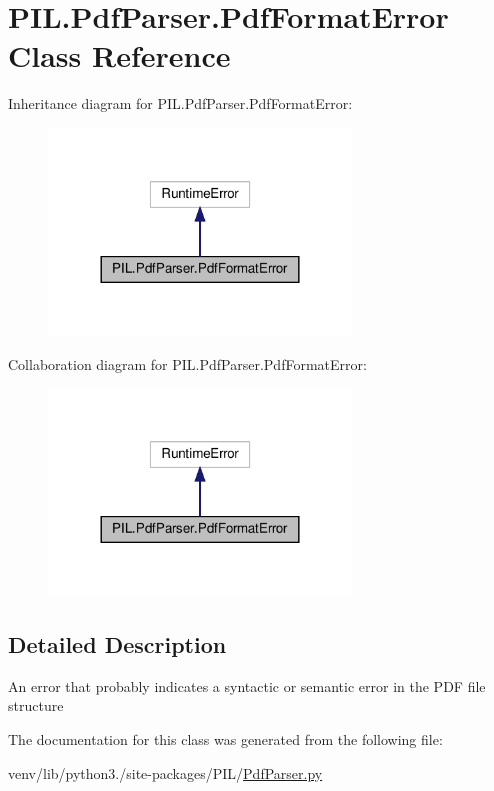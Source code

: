 \hypertarget{classPIL_1_1PdfParser_1_1PdfFormatError}{}\section{P\+I\+L.\+Pdf\+Parser.\+Pdf\+Format\+Error Class Reference}
\label{classPIL_1_1PdfParser_1_1PdfFormatError}


Inheritance diagram for P\+I\+L.\+Pdf\+Parser.\+Pdf\+Format\+Error\+:
\nopagebreak
\begin{figure}[H]
\begin{center}
\leavevmode
\includegraphics[width=228pt]{classPIL_1_1PdfParser_1_1PdfFormatError__inherit__graph}
\end{center}
\end{figure}


Collaboration diagram for P\+I\+L.\+Pdf\+Parser.\+Pdf\+Format\+Error\+:
\nopagebreak
\begin{figure}[H]
\begin{center}
\leavevmode
\includegraphics[width=228pt]{classPIL_1_1PdfParser_1_1PdfFormatError__coll__graph}
\end{center}
\end{figure}


\subsection{Detailed Description}
\begin{DoxyVerb}An error that probably indicates a syntactic or semantic error in the
PDF file structure\end{DoxyVerb}
 

The documentation for this class was generated from the following file\+:\begin{DoxyCompactItemize}
\item 
venv/lib/python3./site-\/packages/\+P\+I\+L/\hyperlink{PdfParser_8py}{Pdf\+Parser.\+py}\end{DoxyCompactItemize}
